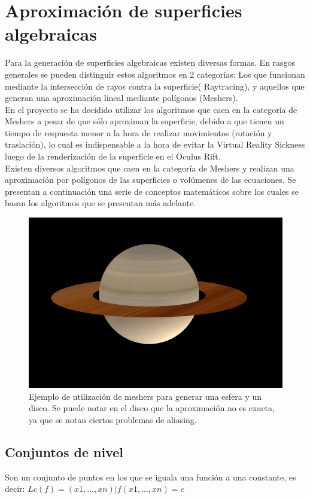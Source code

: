 \documentclass[12pt]{article}
\begin{document}
\section{Aproximación de superficies algebraicas}
Para la generación de superficies algebraicas existen diversas formas. En rasgos generales se pueden distinguir estos algoritmos en 2 categorías: Los que funcionan mediante la intersección de rayos contra la superficie( Raytracing), y aquellos que generan una aproximación lineal mediante polígonos (Meshers).
\\En el proyecto se ha decidido utilizar los algoritmos que caen en la categoría de Meshers\cite{mykola1}\cite{mykola2} a pesar de que sólo aproximan la superficie, debido a que tienen un tiempo de respuesta menor a la hora de realizar movimientos (rotación y traslación), lo cual es indispensable a la hora de evitar la Virtual Reality Sickness luego de la renderización de la superficie en el Oculus Rift.
\\Existen diversos algoritmos que caen en la categoría de Meshers y realizan una aproximación por polígonos de las superficies o volúmenes de las ecuaciones. Se presentan a continuación una serie de conceptos matemáticos sobre los cuales se basan los algoritmos que se presentan más adelante.
\begin{figure}[h]
\includegraphics[width=\textwidth]{saturno.png}
\caption{Ejemplo de utilización de meshers para generar una esfera y un disco. Se puede notar en el disco que la aproximación no es exacta, ya que se notan ciertos problemas de aliasing.}
\end{figure}
\clearpage
\subsection{Conjuntos de nivel}
Son un conjunto de puntos en los que se iguala una función a una constante, es decir:
$Lc(f) = {(x1,...,xn) | f(x1,...,xn)  = c}$
\end{document}
